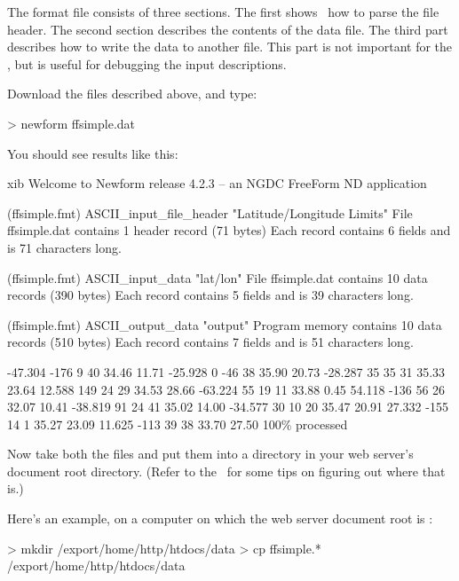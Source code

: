 The format file consists of three sections.  The first shows \ffnd\
how to parse the file header.  The second section describes the
contents of the data file.  The third part describes how to write the
data to another file.  This part is not important for the \ffs , but
is useful for debugging the input descriptions.

Download the  files described above, and type:

\begin{example}
> newform ffsimple.dat
\end{example}

You should see results like this:

\begin{vcode}{xib}
Welcome to Newform release 4.2.3 -- an NGDC FreeForm ND application

(ffsimple.fmt) ASCII_input_file_header  "Latitude/Longitude Limits"
File ffsimple.dat contains 1 header record (71 bytes)
Each record contains 6 fields and is 71 characters long.

(ffsimple.fmt) ASCII_input_data "lat/lon"
File ffsimple.dat contains 10 data records (390 bytes)
Each record contains 5 fields and is 39 characters long.

(ffsimple.fmt) ASCII_output_data        "output"
Program memory contains 10 data records (510 bytes)
Each record contains 7 fields and is 51 characters long.

   -47.304 -176   9  40            34.46     11.71
   -25.928    0 -46  38            35.90     20.73
   -28.287   35  35  31            35.33     23.64
    12.588  149  24  29            34.53     28.66
   -63.224   55  19  11            33.88      0.45
    54.118 -136  56  26            32.07     10.41
   -38.819   91  24  41            35.02     14.00
   -34.577   30  10  20            35.47     20.91
    27.332 -155  14   1            35.27     23.09
    11.625 -113  39  38            33.70     27.50
100\% processed
\end{vcode}

Now take both the  files and put them into a directory
in your web server's document root directory.  (Refer to the
\DODSuser\ for some tips on figuring out where that is.)

Here's an example, on a computer on which the web server document root
is \lit{/export/home/http/htdocs}:

\begin{example}
> mkdir /export/home/http/htdocs/data
> cp ffsimple.* /export/home/http/htdocs/data
\end{example}

